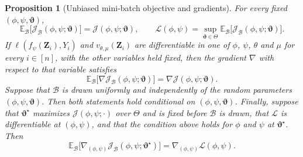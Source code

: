 \documentclass{article} %
\newtheorem{proposition}[theorem]{Proposition}
\begin{document}
\begin{proposition}[Unbiased mini-batch objective and gradients]
\label{prop:mini-batch}
For every fixed $(\phi,\psi,\boldsymbol{\vartheta})$,
\begin{equation}
  \mathbb{E}_{\mathcal{B}}\bigl[\mathcal{J}_{\mathcal{B}}(\phi,\psi;\boldsymbol{\vartheta})\bigr]
  =\mathcal{J}(\phi,\psi;\boldsymbol{\vartheta}),
  \qquad
  \mathcal{L}(\phi,\psi)
  =\sup_{\boldsymbol{\vartheta}\in\Theta}
   \mathbb{E}_{\mathcal{B}}\bigl[\mathcal{J}_{\mathcal{B}}(\phi,\psi;\boldsymbol{\vartheta})\bigr].
  \label{eq:mb-unbiased-value}
\end{equation}
If $\ell(f_{\psi}(\mathbf{Z}_i),Y_i)$ and $v_{\theta,\mu}(\mathbf{Z}_i)$ are differentiable in one of $\phi$, $\psi$, $\theta$ and $\mu$ for every $i\in[n]$, with the other variables held fixed, then the gradient $\nabla$ with respect to that variable satisfies
\begin{equation}
  \mathbb{E}_{\mathcal{B}}\bigl[\nabla\mathcal{J}_{\mathcal{B}}(\phi,\psi;\boldsymbol{\vartheta})\bigr]
  =\nabla\mathcal{J}(\phi,\psi;\boldsymbol{\vartheta}).
  \label{eq:mb-unbiased-gradient}
\end{equation}
Suppose that $\mathcal{B}$ is drawn uniformly and independently of the random parameters $(\phi,\psi,\boldsymbol{\vartheta})$.
Then both statements hold conditional on $(\phi,\psi,\boldsymbol{\vartheta})$.  Finally, suppose that $\boldsymbol{\vartheta}^{\star}$ maximizes $\mathcal{J}(\phi,\psi;\cdot)$ over $\Theta$ and is fixed before $\mathcal{B}$ is drawn, that $\mathcal{L}$ is differentiable at $(\phi,\psi)$, and that the condition above holds for $\phi$ and $\psi$ at $\boldsymbol{\vartheta}^{\star}$.  Then
\begin{equation}
  \mathbb{E}_{\mathcal{B}}\bigl[\nabla_{(\phi,\psi)}\mathcal{J}_{\mathcal{B}}(\phi,\psi;\boldsymbol{\vartheta}^{\star})\bigr]
  =\nabla_{(\phi,\psi)}\mathcal{L}(\phi,\psi).
  \label{eq:mb-envelope-gradient}
\end{equation}
\end{proposition}
\end{document}
